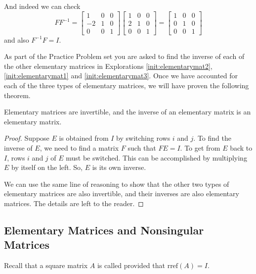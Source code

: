 \documentclass{ximera}
\begin{document}
And indeed we can check $$F F^{-1} = \begin{bmatrix}  
 1&0&0\\-2&1&0\\0&0&1
 \end{bmatrix} \begin{bmatrix}  
 1&0&0\\2&1&0\\0&0&1
 \end{bmatrix} = \begin{bmatrix}  
 1&0&0\\0&1&0\\0&0&1
 \end{bmatrix}$$
 and also $ F^{-1} F = I$.

As part of the Practice Problem set you are asked to find the inverse of each of the other elementary matrices in Explorations \ref{init:elementarymat2}, \ref{init:elementarymat1} and \ref{init:elementarymat3}.  Once we have accounted for each of the three types of elementary matrices, we will have proven the following theorem.  

\begin{theorem}\label{th:elemmatricesinvertible}
Elementary matrices are invertible, and the inverse of an elementary matrix is an elementary matrix.
\end{theorem}
\begin{proof}
Suppose $E$ is obtained from $I$ by switching rows $i$ and $j$.  To find the inverse of $E$, we need to find a matrix $F$ such that $FE=I$.  To get from $E$ back to $I$, rows $i$ and $j$ of $E$ must be switched.  This can be accomplished by multiplying $E$ by itself on the left.  So, $E$ is its own inverse.

We can use the same line of reasoning to show that the other two types of elementary matrices are also invertible, and their inverses are also elementary matrices.  The details are left to the reader. 
\end{proof}


\subsection*{Elementary Matrices and Nonsingular Matrices} 

Recall that a square matrix $A$ is called  provided that $\mbox{rref}(A)=I$.
\end{document}
